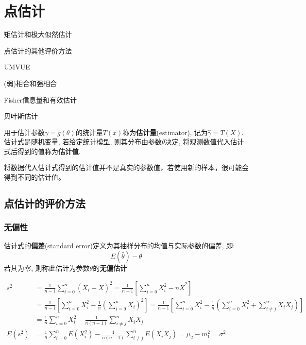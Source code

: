 \chapter{点估计}

\begin{introduction}[考试重点]
    \item 矩估计和极大似然估计
    \item 点估计的其他评价方法
    \item UMVUE
    \item (弱)相合和强相合
    \item Fisher信息量和有效估计
    \item 贝叶斯估计
\end{introduction}

\begin{definition}[点估计]
    用于估计参数$\gamma = g(\theta)$的统计量$T(x)$称为\textbf{估计量}(estimator), 记为$\hat{\gamma} = T(X)$. 估计式是随机变量, 若给定统计模型, 则其分布由参数$\theta$决定, 将观测数值代入估计式后得到的值称为\textbf{估计值}.
\end{definition}

将数据代入估计式得到的估计值并不是真实的参数值，若使用新的样本，很可能会得到不同的估计值。

\section{点估计的评价方法}

\subsection{无偏性}

\begin{definition}[无偏估计]
    估计式的\textbf{偏差}(standard error)定义为其抽样分布的均值与实际参数的偏差, 即:
    \[ E(\hat{\theta})-\theta \]
    若其为零, 则称此估计为参数$\theta$的\textbf{无偏估计}
\end{definition}

\begin{example}[方差的无偏估计]
    \begin{align*}
        s^2    & = \frac1{n-1} \sum_{i=0}^n (X_i-\bar{X})^2=\frac1{n-1} [\sum_{i=0}^n X_i^2 - n\bar{X}^2]                                                                         \\
               & =\frac1{n-1} [\sum_{i=0}^n X_i^2 - \frac1n  (\sum_{i=0}^n X_i)^2] = \frac1{n-1} [\sum_{i=0}^n X_i^2 - \frac1n  (\sum_{i=0}^n X_i^2 + \sum_{i \neq j}^n X_i X_j)] \\
               & = \frac1n  \sum_{i=0}^n X_i^2 - \frac1{n(n-1)} \sum_{i \neq j}^n X_i X_j                                                                                         \\
        E(s^2) & = \frac1n  \sum_{i=0}^n E(X_i^2) - \frac1{n(n-1)} \sum_{i \neq j}^n E(X_i X_j) = \mu_2-m_1^2=\sigma^2
    \end{align*}
\end{example}

